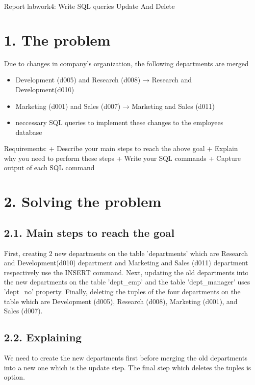 \documentclass{report}
\begin{document}
\begin{center}
Report labwork4: Write SQL queries Update And Delete
\end{center}
\section*{1. The problem}
Due to changes in company’s organization, the following departments are merged
\begin{itemize}
	\item Development (d005) and Research (d008) → Research and Development(d010)
	\item Marketing (d001) and Sales (d007) → Marketing and Sales (d011)
	\item neccessary SQL queries to implement these changes to the employees database
\end{itemize}
Requirements:
+ Describe your main steps to reach the above goal
+ Explain why you need to perform these steps
+ Write your SQL commands
+ Capture output of each SQL command


\section*{2. Solving the problem}
\subsection*{2.1. Main steps to reach the goal}

\indent First, creating 2 new departments on the table 'departments' which are Research and Development(d010) department and Marketing and Sales (d011) department respectively use the INSERT command.
\indent Next, updating the old departments into the new departments on the table 'dept_emp' and the table 'dept_manager' uses 'dept_no' property.
\indent Finally, deleting the tuples of the four departments on the table which are Development (d005), Research (d008), Marketing (d001), and Sales (d007).

\subsection*{2.2. Explaining}
\indent We need to create the new departments first before merging the old departments into a new one which is the update step. The final step which deletes the tuples is option.
\end{document}
